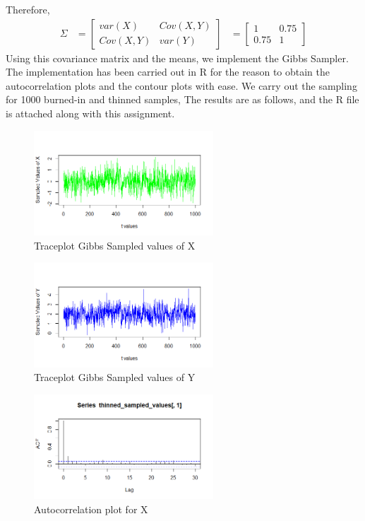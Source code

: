 \documentclass[11pt]{article}
\begin{document}
Therefore,
\begin{equation}
  \nonumber
  \begin{aligned}
    \Sigma & = \begin{bmatrix}
      var(X) & Cov(X, Y)\\
      Cov(X, Y) & var(Y)
      \end{bmatrix}
      & =  \begin{bmatrix}
        1 & 0.75\\
        0.75 & 1
        \end{bmatrix}
  \end{aligned}
\end{equation}
Using this covariance matrix and the means, we implement the Gibbs Sampler. The implementation has been carried out in R for the reason to obtain the autocorrelation plots and the contour plots with ease. We carry out the sampling for 1000 burned-in and thinned samples,
The results are as follows, and the R file is attached along with this assignment.
\begin{figure}[H]
  \centering
  \includegraphics[width = 0.6\textwidth]{gibbs1-2.png}
  \caption{Traceplot Gibbs Sampled values of X}
\end{figure}
\begin{figure}[H]
  \centering
  \includegraphics[width = 0.6\textwidth]{gibbs2-2.png}
  \caption{Traceplot Gibbs Sampled values of Y}
\end{figure}
\begin{figure}[H]
  \centering
  \includegraphics[width = 0.6\textwidth]{ACF-1.png}
  \caption{Autocorrelation plot for X}
\end{figure}
\end{document}
